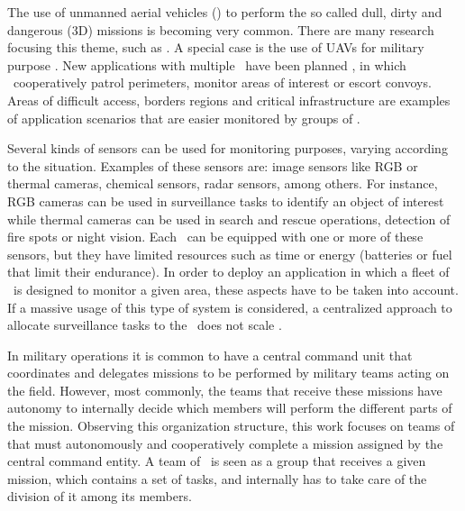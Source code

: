 The use of unmanned aerial vehicles (\uavs) to perform the so called dull, dirty and dangerous (3D) missions is becoming very common. There are many research focusing this theme, such as \cite{shirzadeh2017vision,sun2015route,kladis2011energy}. 
A special case is the use of UAVs for military purpose \cite{nonami2010autonomous}. New applications with multiple \uavs\ have been planned  \cite{zheng2004coevolving,UAVsmith2014autonomous,UAVsong2014persistent,UAVqu2015research}, in which \uavs\ cooperatively patrol perimeters, monitor areas of interest or escort convoys. Areas of difficult access, borders regions and critical infrastructure are examples of application scenarios that are easier monitored by groups of \uavs.

Several kinds of sensors can be used for monitoring purposes, varying according to the situation. Examples of these sensors are: image sensors like RGB or thermal cameras, chemical sensors, radar sensors, among others. For instance, RGB cameras can be used in surveillance tasks to identify an object of interest while thermal cameras can be used in search and rescue operations, detection of fire spots or night vision. Each \uav\ can be equipped with one or more of these sensors, but they have limited resources such as time or energy (batteries or fuel that limit their endurance). In order to deploy an application in which a fleet of \uavs\ is designed to monitor a given area, these aspects have to be taken into account. If a massive usage of this type of system is considered, a centralized approach to allocate surveillance tasks to the \uavs\ does not scale \cite{alighanbari2005decentralized}.

In military operations it is common to have a central command unit that coordinates and delegates missions to be performed by military teams acting on the field. However, most commonly, the teams that receive these missions have autonomy to internally decide which members will perform the different parts of the mission. Observing this organization structure, this work focuses on teams of \uavs\, that must autonomously and cooperatively complete a mission assigned by the central command entity. A team of \uavs\ is seen as a group that receives a given mission, which contains a set of tasks, and internally has to take care of the division of it among its members.


